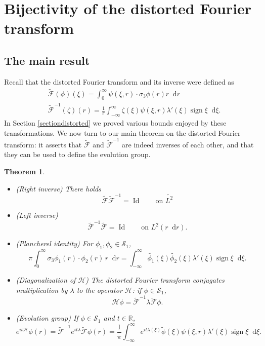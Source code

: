 \documentclass[11 pt]{amsart}
\newtheorem{thm}{Theorem}[section]
\theoremstyle{definition}
\theoremstyle{remark}
\numberwithin{equation}{section}
\newcommand{\dd}{\mathop{}\!\mathrm{d}}
\begin{document}
\section{Bijectivity of the distorted Fourier transform}

\label{sectionbijectivity}

\subsection{The main result}

Recall that the distorted Fourier transform and its inverse were defined as
\begin{align*}
& \widetilde{\mathcal{F}}(\phi)(\xi) = \int_0^\infty \psi(\xi,r) \cdot \sigma_3 \phi(r) r \dd r \\
& \widetilde{\mathcal{F}}^{-1}(\zeta)(r) = \frac 1 \pi \int_{-\infty}^\infty \zeta (\xi) \psi(\xi,r) \lambda'(\xi) \operatorname{sign} \xi \dd\xi.
\end{align*}
In Section \ref{sectiondistorted} we proved various bounds enjoyed by these transformations. We now turn to our main theorem on the distorted Fourier transform: it asserts that $\widetilde{\mathcal{F}}$ and $\widetilde{\mathcal{F}}^{-1}$ are indeed inverses of each other, and that they can be used to define the evolution group.

\begin{thm}  \label{prop:invertibility-pointwise-properties-fourier}
\begin{itemize}
\item[(i)] (Right inverse)
There holds
$$
\widetilde{\mathcal{F}} \widetilde{\mathcal{F}}^{-1} = \operatorname{Id} \qquad \mbox{on $\widetilde{L^2}$}
$$

\item[(ii)] (Left inverse)
$$
\widetilde{\mathcal{F}}^{-1} \widetilde{\mathcal{F}} = \operatorname{Id} \qquad \mbox{on $L^2(r \dd r)$}.
$$

\item[(iii)] (Plancherel identity)
For $\phi_1,\phi_2 \in \mathcal{S}_1$, 
$$
\pi \int_0^\infty \sigma_3 \phi_1(r) \cdot \phi_2(r) \,r\dd r 
= \int_{-\infty}^\infty \widetilde{\phi_1}(\xi) \widetilde{\phi_2} (\xi) \lambda'(\xi) \operatorname{sign} \xi \dd \xi.
$$
\item[(iv)] (Diagonalization of $\mathcal{H}$) The distorted Fourier transform conjugates multiplication by $\lambda$ to the operator $\mathcal{H}$: if $\phi \in \mathcal{S}_1$,
$$
\mathcal{H} \phi = \widetilde{\mathcal{F}}^{-1} \lambda \widetilde{\mathcal{F}} \phi.
$$
\item[(v)] (Evolution group) If $\phi \in \mathcal{S}_1$ and $t \in \mathbb{R}$,
$$
\label{formulaeitH}
e^{it \mathcal{H}} \phi (r)= \widetilde{\mathcal{F}}^{-1} e^{it \lambda} \widetilde{\mathcal{F}} \phi (r) = \frac{1}{\pi} \int_{-\infty}^\infty e^{it \lambda(\xi)}   \widetilde{\phi} (\xi) \psi(\xi,r)\lambda'(\xi) \operatorname{sign}\xi \dd \xi.
$$
\end{itemize}
\end{thm}
\end{document}
